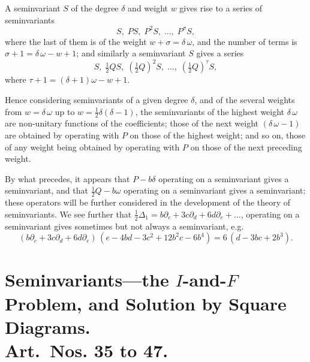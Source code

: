 \documentclass[11pt,a4paper]{book}
\begin{document}
{{{\setcounter{art}{33}
\begin{art}
A seminvariant $S$ of the degree $\delta$ and weight $w$ gives rise to a series of seminvariants
\[
S,\; PS,\; P^{2}S,\; \ldots,\; P^{\sigma}S,
\]
where the last of them is of the weight $w + \sigma = \delta\,\omega$, and the number of terms is $\sigma + 1 = \delta\,\omega - w + 1$; and similarly a seminvariant $S$ gives a series
\[
S,\; \tfrac{1}{2}QS,\; (\tfrac{1}{2}Q)^{2}S,\; \ldots,\; (\tfrac{1}{2}Q)^{\tau}S,
\]
where $\tau + 1 = (\delta + 1)\omega - w + 1$.

Hence considering seminvariants of a given degree $\delta$, and of the several weights from $w = \delta\,\omega$ up to $w = \frac{1}{2}\delta(\delta - 1)$, the seminvariants of the highest weight $\delta\,\omega$ are non-unitary functions of the coefficients; those of the next weight $(\delta\,\omega - 1)$ are obtained by operating with $P$ on those of the highest weight; and so on, those of any weight being obtained by operating with $P$ on those of the next preceding weight.
\end{art}

\setcounter{art}{34}
\begin{art}
By what precedes, it appears that $P - b\delta$ operating on a seminvariant gives a seminvariant, and that $\frac{1}{2}Q - b\omega$ operating on a seminvariant gives a seminvariant: these operators will be further considered in the development of the theory of seminvariants. We see further that $\frac{1}{2}\Delta_{1} = b\partial_{c} + 3c\partial_{d} + 6d\partial_{e} + \ldots$, operating on a seminvariant gives sometimes but not always a seminvariant, e.g.
\[
(b\partial_{c} + 3c\partial_{d} + 6d\partial_{e})\,(e - 4bd - 3c^{2} + 12b^{2}c - 6b^{4}) = 6\,(d - 3bc + 2b^{3}).
\]
\end{art}

\section*{Seminvariants---the $I$-and-$F$ Problem, and Solution by Square Diagrams.\\ Art.~Nos. \textbf{35} to \textbf{47}.}

}}}
\end{document}
